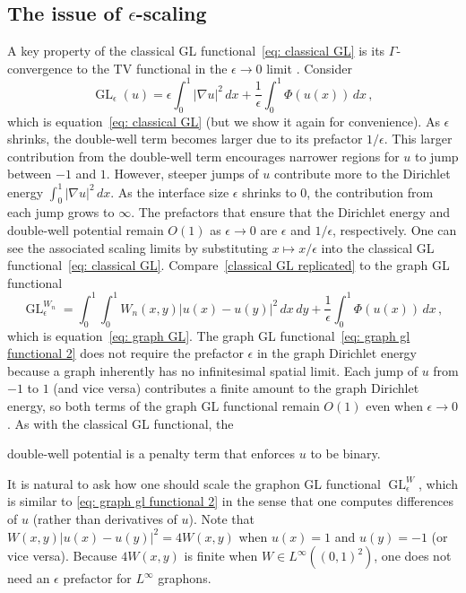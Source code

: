 \documentclass[11pt]{amsart}
\def\ep{\epsilon}
\def\ra{\rightarrow}
\def\GL{\operatorname{GL}}
\numberwithin{equation}{section}
\begin{document}
{{\medskip



\subsection{\texorpdfstring{The issue of $\ep$-scaling}{The issue of ep scaling}}\label{sec: scaling}

A key property of the classical GL functional~\eqref{eq: classical GL} is its $\Gamma$-convergence to the TV functional in the $\ep \ra 0$ limit \cite{modica1977esempio}. Consider
\begin{equation} 
\label{classical GL replicated}
	 \GL_\ep(u) = \ep \int_0^1 |\nabla u|^2 \,dx + \frac{1}{\ep} \int_0^1 \Phi(u(x)) \,dx \,, 
\end{equation}	 
which is equation~\eqref{eq: classical GL} (but we show it again for convenience).
As $\ep$ shrinks, the double-well term becomes larger due to its prefactor ${1}/{\ep}$. This larger contribution from the double-well term encourages narrower regions for $u$ to jump between $-1$ and $1$. However, steeper jumps of $u$ contribute more to the Dirichlet energy $\int_0^1 |\nabla u|^2 \,dx$. As the interface size $\ep$ shrinks to $0$, the contribution from each jump grows to $\infty$. The prefactors that ensure that the Dirichlet energy and double-well potential remain $O(1)$ as $\ep \ra 0$ are $\ep$ and $1/\ep$, respectively. One can see {the associated scaling limits} by substituting $x \mapsto x/\ep$ into the classical GL functional~\eqref{eq: classical GL}. Compare~\eqref{classical GL replicated} to the graph GL functional
\begin{equation}\label{eq: graph gl functional 2}
	\GL^{W_n}_\ep = \int_0^1\int_0^1 W_n(x,y)|u(x)-u(y)|^2 \, dx \, dy + \frac{1}{\ep} \int_0^1 \Phi(u(x))\,dx  \,,
\end{equation}	
which is equation~\eqref{eq: graph GL}. The graph GL functional~\eqref{eq: graph gl functional 2} does not require the prefactor $\ep$ in the graph Dirichlet energy because a graph inherently has no infinitesimal spatial {limit. Each} jump of $u$ from $-1$ to $1$ {(and vice versa)} contributes a finite amount to the {graph} Dirichlet energy, so both {terms of the graph GL functional remain} $O(1)$ even when $\ep \ra 0$. As with the classical GL functional, the} double-well potential is a penalty term that enforces $u$ to be binary.

It is natural to ask how one should scale the graphon GL functional $\GL^W_\ep$, which is similar {to \eqref{eq: graph gl functional 2} in the sense that} one computes differences of $u$ (rather than derivatives of $u$). Note that $W(x,y) |u(x) - u(y)|^2 = 4 W(x,y)$ when $u(x) = 1$ and $u(y) = -1$ (or vice versa). Because $4W(x,y)$ is finite when $W \in L^\infty((0,1)^2)$, one does not need an $\ep$ prefactor {for} $L^\infty$ graphons. 

}
\end{document}
